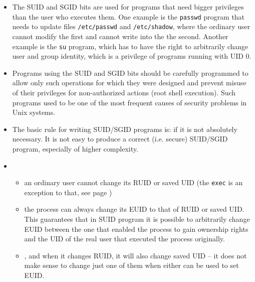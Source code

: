 \begin{itemize}
\item \label{SUID_BIT} The SUID and SGID bits are used for programs that need
bigger privileges than the user who executes them. One example is the
\texttt{passwd} program that needs to update files \texttt{/etc/passwd} and
\texttt{/etc/shadow}, where the ordinary user cannot modify the first and
cannot write into the the second. Another example is the \texttt{su} program,
which has to have the right to arbitrarily change user and group identity,
which is a privilege of programs running with UID 0.
\item Programs using the SUID and SGID bits should be carefully programmed
to allow only such operations for which they were designed and prevent misuse
of their privileges for non-authorized actions (root shell execution).
Such programs used to be one of the most frequent causes of security problems
in Unix systems.
\item The basic rule for writing SUID/SGID programs is:  if it is not absolutely necessary.  It is not easy to produce a correct
(i.e. secure) SUID/SGID program, especially of higher complexity.
\item {}
\begin{itemize}
\item an ordinary user cannot change its RUID or saved UID (the \texttt{exec} is
an exception to that, see page \pageref{EXEC})
\item the process can always change its EUID to that of RUID or saved UID.
This guarantees that in SUID program it is possible to arbitrarily change EUID
between the one that enabled the process to gain ownership rights and the
UID of the real user that executed the process originally.
\item {}, and when it changes RUID, it will also
change saved UID -- it does not make sense to change just one of them when
either can be used to set EUID.
\end{itemize}
\end{itemize}



